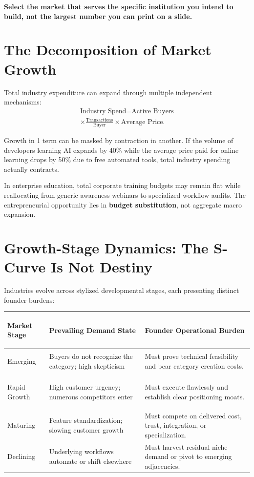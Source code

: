 \textbf{Select the market that serves the specific institution you intend to build, not the largest number you can print on a slide.}

\section{The Decomposition of Market Growth}

Total industry expenditure can expand through multiple independent mechanisms:
\begin{multline}
\label{eq:revenue_decomp}
\text{Industry Spend} = \text{Active Buyers} \\
\times \frac{\text{Transactions}}{\text{Buyer}} \times \text{Average Price}.
\end{multline}

Growth in 1 term can be masked by contraction in another. If the volume of developers learning AI expands by 40\% while the average price paid for online learning drops by 50\% due to free automated tools, total industry spending actually contracts.

In enterprise education, total corporate training budgets may remain flat while reallocating from generic awareness webinars to specialized workflow audits. The entrepreneurial opportunity lies in \textbf{budget substitution}, not aggregate macro expansion.

\section{Growth-Stage Dynamics: The S-Curve Is Not Destiny}

Industries evolve across stylized developmental stages, each presenting distinct founder burdens:

\begin{tcolorbox}[
  enhanced,
  colback=BayesSurface!60,
  colframe=BayesBorder,
  boxrule=0.5pt,
  arc=3pt,
  left=3pt,right=3pt,top=3pt,bottom=3pt,
  boxsep=1pt
]
\scriptsize
\begin{tabularx}{\linewidth}{>{\bfseries\raggedright\arraybackslash}p{1.7cm} >{\raggedright\arraybackslash}p{2.4cm} X}
\toprule
\textbf{Market Stage} & \textbf{Prevailing Demand State} & \textbf{Founder Operational Burden} \\
\midrule
Emerging & Buyers do not recognize the category; high skepticism & Must prove technical feasibility and bear category creation costs. \\
\addlinespace[2pt]
Rapid Growth & High customer urgency; numerous competitors enter & Must execute flawlessly and establish clear positioning moats. \\
\addlinespace[2pt]
Maturing & Feature standardization; slowing customer growth & Must compete on delivered cost, trust, integration, or specialization. \\
\addlinespace[2pt]
Declining & Underlying workflows automate or shift elsewhere & Must harvest residual niche demand or pivot to emerging adjacencies. \\
\bottomrule
\end{tabularx}
\end{tcolorbox}

